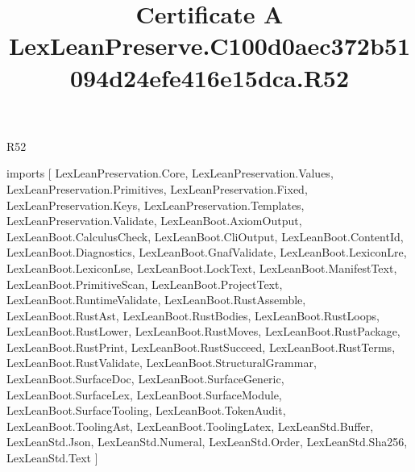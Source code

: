 \begin{lexlean}{R52}
\title{Certificate A LexLeanPreserve.C100d0aec372b51094d24efe416e15dca.R52}
\begin{coremodule}
imports [
  LexLeanPreservation.Core,
  LexLeanPreservation.Values,
  LexLeanPreservation.Primitives,
  LexLeanPreservation.Fixed,
  LexLeanPreservation.Keys,
  LexLeanPreservation.Templates,
  LexLeanPreservation.Validate,
  LexLeanBoot.AxiomOutput,
  LexLeanBoot.CalculusCheck,
  LexLeanBoot.CliOutput,
  LexLeanBoot.ContentId,
  LexLeanBoot.Diagnostics,
  LexLeanBoot.GnafValidate,
  LexLeanBoot.LexiconLre,
  LexLeanBoot.LexiconLse,
  LexLeanBoot.LockText,
  LexLeanBoot.ManifestText,
  LexLeanBoot.PrimitiveScan,
  LexLeanBoot.ProjectText,
  LexLeanBoot.RuntimeValidate,
  LexLeanBoot.RustAssemble,
  LexLeanBoot.RustAst,
  LexLeanBoot.RustBodies,
  LexLeanBoot.RustLoops,
  LexLeanBoot.RustLower,
  LexLeanBoot.RustMoves,
  LexLeanBoot.RustPackage,
  LexLeanBoot.RustPrint,
  LexLeanBoot.RustSucceed,
  LexLeanBoot.RustTerms,
  LexLeanBoot.RustValidate,
  LexLeanBoot.StructuralGrammar,
  LexLeanBoot.SurfaceDoc,
  LexLeanBoot.SurfaceGeneric,
  LexLeanBoot.SurfaceLex,
  LexLeanBoot.SurfaceModule,
  LexLeanBoot.SurfaceTooling,
  LexLeanBoot.TokenAudit,
  LexLeanBoot.ToolingAst,
  LexLeanBoot.ToolingLatex,
  LexLeanStd.Buffer,
  LexLeanStd.Json,
  LexLeanStd.Numeral,
  LexLeanStd.Order,
  LexLeanStd.Sha256,
  LexLeanStd.Text
]


\end{coremodule}
\end{lexlean}
